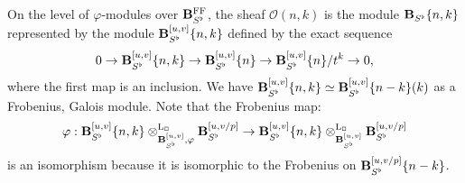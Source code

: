 \documentclass[10pt,reqno]{amsart}
\theoremstyle{definition}
\theoremstyle{remark}
\def\phi{\varphi}
\newcommand{\LL}{\operatorname{L} }
\newcommand{\FF}{\operatorname{FF} }
\newcommand{\so}{{\mathcal O}}
\numberwithin{equation}{section}
\numberwithin{equation}{section}
\begin{document}
   On the level of $\phi$-modules over $\B^{\FF}_{S^{\flat}}$, the sheaf $\so(n,k)$ is the module ${\bf B}_{S^{\flat}}\{n,k\}$ represented by  the module  
${\bf B}_{S^{\flat}}^{[u,v]}\{n,k\}$ defined by the exact sequence
\begin{equation}\label{alter3}
0\to \B_{S^{\flat}}^{[u,v]}\{n,k\}\to \B_{S^{\flat}}^{[u,v]}\{n\}\to \B_{S^{\flat}}^{[u,v]}\{n\}/t^k\to 0,
\end{equation}
where the first map is an inclusion. We have $ {\bf B}_{S^{\flat}}^{[u,v]}\{n,k\} \simeq {\bf B}_{S^{\flat}}^{[u,v]}\{n-k\}(k)$ as a Frobenius, Galois module. 
Note that the Frobenius map:
$$
\phi:  \B_{S^{\flat}}^{[u,v]}\{n,k\} \otimes^{\LL_{\Box}}_{\B_{S^{\flat}}^{[u,v]},\phi}\B_{S^{\flat}}^{[u,v/p]}\to \B_{S^{\flat}}^{[u,v]}\{n,k\} \otimes^{\LL_{\Box}}_{\B_{S^{\flat}}^{[u,v]}}\B_{S^{\flat}}^{[u,v/p]}
$$
is an isomorphism because it is  isomorphic to the Frobenius on ${\bf B}_{S^{\flat}}^{[u,v/p]}\{n-k\}$. 
\end{document}
